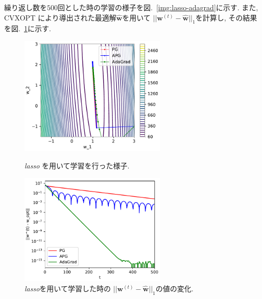 \documentclass[a4paper,10pt]{jsarticle}
\begin{document}
繰り返し数を$500$回とした時の学習の様子を図.~\ref{img:lasso-adagrad}に示す.
また, CVXOPT により導出された最適解$\hat{\bm{w}}$を用いて
$||\bm{w}^{(t)} - \hat{\bm{w}}||_1$を計算し,
その結果を図.~\ref{img:lasso-dist-adagrad}に示す.
\begin{figure}[htbp]
 \begin{minipage}{0.5\hsize}
  \begin{center}
   \includegraphics[width=7cm]{figs/p2_lasso_result_pg-apg-adagrad.pdf}
  \end{center}
  \caption{\textit{lasso} を用いて学習を行った様子.}
  \label{img:lasso-adagrad}
 \end{minipage}
 \begin{minipage}{0.5\hsize}
  \begin{center}
   \includegraphics[width=7cm]{figs/p2_lasso_dist_adagrad.pdf}
  \end{center}
  \caption{\textit{lasso}を用いて学習した時の
  $||\bm{w}^{(t)} - \hat{\bm{w}}||_1$の値の変化.}
  \label{img:lasso-dist-adagrad}
 \end{minipage}
\end{figure}
\end{document}
